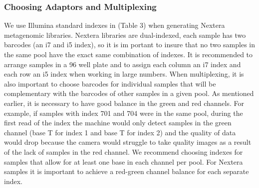 \documentclass[graybox]{svmult}
\begin{document}
\subsubsection{Choosing Adaptors and Multiplexing}

We use Illumina standard indexes in (Table 3) when generating Nextera metagenomic libraries. Nextera libraries are dual-indexed, each sample has two  barcodes (an i7 and i5 index), so it is im
portant to insure that no two samples in the same pool have the exact same combination of indexes. It is recommended to arrange samples in a 96 well plate and to assign each column an i7 index
 and each row an i5 index when working in large numbers. When multiplexing, it is also important to choose barcodes for individual samples that will be complementary with the barcodes of other
 samples in a given pool. As mentioned earlier, it is necessary to have good balance in the green and red channels. For example, if samples with index 701 and 704 were in the same pool, during
 the first read of the index the machine would only detect samples in the green channel (base T for index 1 and base T for index 2) and the quality of data would drop because the camera would 
struggle to take quality images as a result of the lack of samples in the red channel. We recommend choosing indexes for samples that allow for at least one base in each channel per pool. For 
Nextera samples it is important to achieve a red-green channel balance for each separate index.
\end{document}
